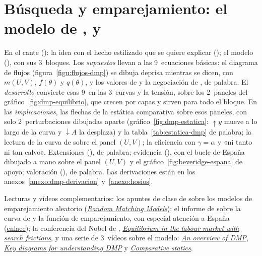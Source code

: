 \documentclass[11pt]{article}
\begin{document}
\section{Búsqueda y emparejamiento: el modelo\cortetitulo{} de ,  y }\label{sec:dmp}

\begin{notaopositor}
En el cante (): la idea con el hecho estilizado que se quiere explicar (); el modelo (), con sus 3~bloques. Los \emph{supuestos} llevan a las 9~ecuaciones básicas: el diagrama de flujos (figura~\ref{figu:flujos-dmp}) se dibuja deprisa mientras se dicen, con $m(U,V)$, $f(\theta)$ y $q(\theta)$, y los valores de  y la negociación de , de palabra. El \emph{desarrollo} convierte esas 9~en las 3~curvas y la tensión, sobre los 2~paneles del gráfico~\ref{fig:dmp-equilibrio}, que crecen por capas y sirven para todo el bloque. En las \emph{implicaciones}, las flechas de la estática comparativa sobre esos paneles, con solo 2~perturbaciones dibujadas aparte (gráfico~\ref{fig:dmp-estatica}: $\uparrow y$ mueve a lo largo de la curva y $\downarrow A$ la desplaza) y la tabla~\ref{tab:estatica-dmp} de palabra; la lectura de la curva de  sobre el panel $(U,V)$; la eficiencia con $\gamma=\alpha$ y «ni tanto ni tan calvo». Extensiones (), de palabra; evidencia (), con el bucle de España dibujado a mano sobre el panel $(U,V)$ y el gráfico~\ref{fig:beveridge-espana} de apoyo; valoración (), de palabra. Las derivaciones están en los anexos~\ref{anexo:dmp-derivacion} y~\ref{anexo:hosios}.
\end{notaopositor}

\begin{anotaciones}
Lecturas y vídeos complementarios: los apuntes de clase de \textcite{FernandezVillaverde2021RandomMatching} sobre los modelos de emparejamiento aleatorio (\href{https://www.sas.upenn.edu/~jesusfv/lecture8_random_matching.pdf}{\emph{Random Matching Models}}); el informe de \textcite{NunezUsabiaga2007} sobre la curva de  y la función de emparejamiento, con especial atención a España (\href{https://centrodeestudiosandaluces.es/datos/paginas/factoria/ideas/informe_curva_beveridge.pdf}{enlace}); la conferencia del Nobel de , \href{https://youtu.be/YHXRB78mtUA?t=856}{\emph{Equilibrium in the labour market with search frictions}}, y una serie de 3~vídeos sobre el modelo: \href{https://www.youtube.com/watch?v=7w_7maLn3M8}{\emph{An overview of DMP}}, \href{https://www.youtube.com/watch?v=ztIdoLMN79w}{\emph{Key diagrams for understanding DMP}} y \href{https://www.youtube.com/watch?v=bIgDar4JJF4}{\emph{Comparative statics}}.
\end{anotaciones}
\end{document}
